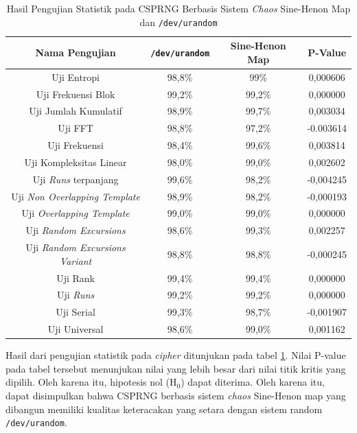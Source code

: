 \begin{table}[!h]
  \centering
  \caption{Hasil Pengujian Statistik pada CSPRNG Berbasis Sistem \emph{Chaos} Sine-Henon Map dan \texttt{/dev/urandom}} \label{tab:test.statistic.chaos}
  \begin{tabular}{|c|c|c|c|}
    \hline
    Nama Pengujian & \texttt{/dev/urandom} & Sine-Henon Map & P-Value \\ \hline
    Uji Entropi & 98,8\% & 99\% & 0,000606 \\ \hline
    Uji Frekuensi Blok & 99,2\% & 99,2\% & 0,000000 \\ \hline
    Uji Jumlah Kumulatif & 98,9\% & 99,7\% & 0,003034 \\ \hline
    Uji FFT & 98,8\% & 97,2\% & -0.003614 \\ \hline
    Uji Frekuensi & 98,4\% & 99,6\% & 0,003814 \\ \hline
    Uji Kompleksitas Linear & 98,0\% & 99,0\% & 0,002602 \\ \hline
    Uji \emph{Runs} terpanjang & 99,6\% & 98,2\% & -0,004245 \\ \hline
    Uji \emph{Non Overlapping Template} & 98,9\% & 98,2\% & -0,000193 \\ \hline
    Uji \emph{Overlapping Template} & 99,0\% & 99,0\% & 0,000000 \\ \hline
    Uji \emph{Random Excursions} & 98,6\% & 99,3\% & 0,002257 \\ \hline
    Uji \emph{Random Excursions Variant} & 98,8\% & 98,8\% & -0,000245 \\ \hline
    Uji Rank & 99,4\% & 99,4\% & 0,000000 \\ \hline
    Uji \emph{Runs} & 99,2\% & 99,2\% & 0,000000 \\ \hline
    Uji Serial & 99,3\% & 98,7\% & -0,001907 \\ \hline
    Uji Universal & 98,6\% & 99,0\% & 0,001162 \\ \hline
  \end{tabular}
\end{table}

Hasil dari pengujian statistik pada \emph{cipher} ditunjukan pada tabel \ref{tab:test.statistic.chaos}. Nilai P-value pada tabel tersebut menunjukan nilai yang lebih besar dari nilai titik kritis yang dipilih. Oleh karena itu, hipotesis nol ($\text{H}_0$) dapat diterima. Oleh karena itu, dapat disimpulkan bahwa CSPRNG berbasis sistem \emph{chaos} Sine-Henon map yang dibangun memiliki kualitas keteracakan yang setara dengan sistem random \texttt{/dev/urandom}.

